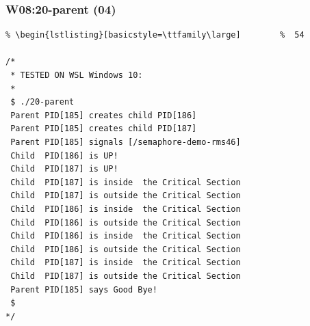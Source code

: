 \documentclass[aspectratio=169, xcolor=table, notheorems, hyperref={pdfpagelabels=false}]{beamer}
\begin{document}
\begin{frame}[fragile]
\frametitle{W08:20-parent (04)}
\begin{lstlisting}[basicstyle=\ttfamily\footnotesize] %  72
% \begin{lstlisting}[basicstyle=\ttfamily\small]        %  65
% \begin{lstlisting}[basicstyle=\ttfamily\large]        %  54

/*
 * TESTED ON WSL Windows 10:
 *
 $ ./20-parent 
 Parent PID[185] creates child PID[186]
 Parent PID[185] creates child PID[187]
 Parent PID[185] signals [/semaphore-demo-rms46]
 Child  PID[186] is UP!
 Child  PID[187] is UP!
 Child  PID[187] is inside  the Critical Section
 Child  PID[187] is outside the Critical Section
 Child  PID[186] is inside  the Critical Section
 Child  PID[186] is outside the Critical Section
 Child  PID[186] is inside  the Critical Section
 Child  PID[186] is outside the Critical Section
 Child  PID[187] is inside  the Critical Section
 Child  PID[187] is outside the Critical Section
 Parent PID[185] says Good Bye!
 $
*/

\end{lstlisting}
\end{frame}

\end{document}
